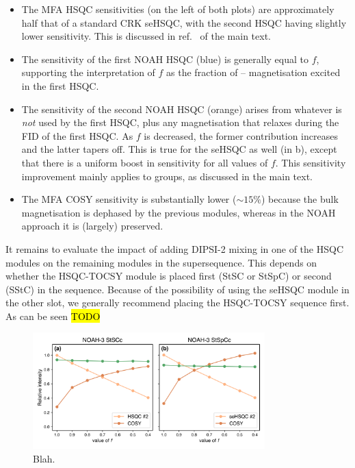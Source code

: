 \begin{itemize}
    \item The MFA HSQC sensitivities (on the left of both plots) are approximately half that of a standard CRK seHSQC, with the second HSQC having slightly lower sensitivity.
        This is discussed in ref.\  of the main text.
    \item The sensitivity of the first NOAH HSQC (blue) is generally equal to $f$, supporting the interpretation of $f$ as the fraction of \carbon{}--\proton{} magnetisation excited in the first HSQC.
    \item The sensitivity of the second NOAH HSQC (orange) arises from whatever is \textit{not} used by the first HSQC, plus any magnetisation that relaxes during the FID of the first HSQC.
        As $f$ is decreased, the former contribution increases and the latter tapers off.
        This is true for the seHSQC as well (in b), except that there is a uniform boost in sensitivity for all values of $f$.
        This sensitivity improvement mainly applies to  groups, as discussed in the main text.
    \item The MFA COSY sensitivity is substantially lower ($\sim 15\%$) because the bulk magnetisation is dephased by the previous modules, whereas in the NOAH approach it is (largely) preserved.
\end{itemize}

It remains to evaluate the impact of adding DIPSI-2 mixing in one of the HSQC modules on the remaining modules in the supersequence.
This depends on whether the HSQC-TOCSY module is placed first (StSC or StSpC) or second (SStC) in the sequence.
Because of the possibility of using the seHSQC module in the other slot, we generally recommend placing the HSQC-TOCSY sequence first.
As can be seen \hl{TODO}

\begin{figure}
    \centering
    \includegraphics[width=0.8\textwidth]{./figures/stsc_comparisons.png}
    \caption{
        Blah.
        \andro{}
    }
    \label{fig:stsc_comparisons}
\end{figure}

